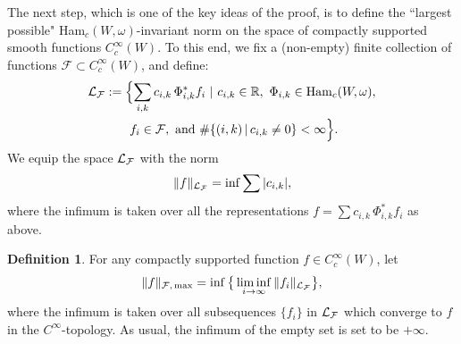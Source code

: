 \documentclass{icmart}
\theoremstyle{definition}
\newtheorem{definition}[theorem]{Definition}
\begin{document}
The next step, which is one of the key ideas of the proof, is to define the ``largest possible"  Ham$_c(W,\omega)$-invariant norm on the space of compactly supported smooth functions $C_c^{\infty}(W)$. To this end, 
we fix a (non-empty) finite collection of functions ${\mathcal F} \subset C_c^{\infty}(W)$, and define: 
%
%
\begin{multline*}
 {\cal L}_{\mathcal F} := \Bigl \{ \sum_{i,k} c_{i,k} \, \Phi_{i,k}^* {f}_i \ | \ c_{i,k} \in {\mathbb R},
\ \Phi_{i,k} \in {\rm Ham}_c(W,\omega),  \\  \ {f}_i \in {\mathcal F},\  
{\rm and} \ \# \{(i,k) \, | \, c_{i,k} \neq 0 \} < \infty \Bigr  \}.
\end{multline*}
%
%
%
%
We equip  the space  ${\cal L}_{\mathcal F} $ with the norm $$ \| f \|_{{\cal L}_{{\mathcal F}}} = \inf
\sum |c_{i,k}|,$$ where the infimum is taken over all the
representations $f = \sum c_{i,k} \, \Phi_{i,k}^* {f}_i$ as above.
\begin{definition}
For any compactly supported function $ f \in C_c^{\infty}(W) $, let
\begin{equation*} %
 \| f \|_{{\cal F}, \, {\rm max}} = \inf \big\{ \liminf_{i \rightarrow \infty} \| f_i
\|_{{\mathcal L}_{{\mathcal F}}} \big\} ,\end{equation*} where the infimum is
taken over all subsequences $\{f_i\}$ in $ {\cal L}_{\mathcal F} $ which
converge to $f$ in the $C^{\infty}$-topology. As usual, the infimum
of the empty set is set to be $+ \infty$.
\end{definition}
\end{document}
